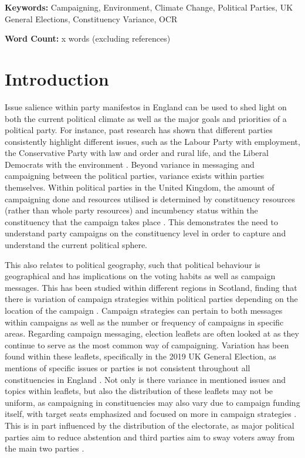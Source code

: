 \documentclass[preprint]{elsarticle} %
\begin{document}
\vspace{0.5cm}

\noindent
\textbf{Keywords:} Campaigning, Environment, Climate Change, Political Parties, UK General Elections, Constituency Variance, OCR
\vspace{0.5cm}

\noindent
\textbf{Word Count:} x words (excluding references)


\newpage
	\section{Introduction}
	
Issue salience within party manifestos in England can be used to shed light on both the current political climate as well as the major goals and priorities of a political party. For instance, past research has shown that different parties consistently highlight different issues, such as the Labour Party with employment, the Conservative Party with law and order and rural life, and the Liberal Democrats with the environment \citep{pogorelisIssueSalienceRegional2005}. Beyond variance in messaging and campaigning between the political parties, variance exists within parties themselves. Within political parties in the United Kingdom, the amount of campaigning done and resources utilised is determined by constituency resources (rather than whole party resources) and incumbency status within the constituency that the campaign takes place \citep{pattieIncumbentPartiesIncumbent2017a}. This demonstrates the need to understand party campaigns on the constituency level in order to capture and understand the current political sphere.


This also relates to political geography, such that political behaviour is geographical and has implications on the voting habits as well as campaign messages. This has been studied within different regions in Scotland, finding that there is variation of campaign strategies within political parties depending on the location of the campaign \citep{pringleClassicsHumanGeography2003,agasosterPartyCohesionLocal2001}. Campaign strategies can pertain to both messages within campaigns as well as the number or frequency of campaigns in specific areas. Regarding campaign messaging, election leaflets are often looked at as they continue to serve as the most common way of campaigning. Variation has been found within these leaflets, specifically in the 2019 UK General Election, as mentions of specific issues or parties is not consistent throughout all constituencies in England  \citep{trummParliamentaryCandidatesTheir2023a}. Not only is there variance in mentioned issues and topics within leaflets, but also the distribution of these leaflets may not be uniform, as campaigning in constituencies may also vary due to campaign funding itself, with target seats emphasized and focused on more in campaign strategies \citep{pattieResourcingConstituencyCampaign2016}. This is in part influenced by the distribution of the electorate, as major political parties aim to reduce abstention and third parties aim to sway voters away from the main two parties \citep{nunezEffectsLocalCampaigning2021}.
\end{document}
